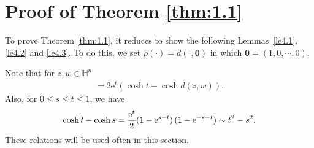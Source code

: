 \documentclass[11pt]{amsproc}
\newcommand{\e}{\mathrm{e}}
\newcommand{\0}{\mathbf{0}}
\renewcommand{\H}{\mathbb{H}}
\numberwithin{equation}{section}
\numberwithin{figure}{section}
\theoremstyle{definition}
\theoremstyle{remark}
\numberwithin{thm}{section}
\begin{document}
\medskip



\section{Proof of Theorem \ref{thm:1.1}}\label{sec:4}
\setcounter{equation}{0}


To prove Theorem \ref{thm:1.1}, it reduces to show  the following Lemmas~\ref{le4.1}, \ref{le4.2} and \ref{le4.3}. To do this,  we set $\rho(\cdot)=d(\cdot,\0)$ in which $\0=(1, 0, \cdots, 0)$.

Note that for $z,w\in\H^n$
\begin{eqnarray*}
[\e^tz-w]=2\e^t(\cosh t-\cosh d(z,w)).
\end{eqnarray*}
Also, for $0\leq s\leq t\leq 1$, we have
\begin{eqnarray*}
\cosh t-\cosh s={\e^t\over 2}(1-\e^{s-t})\,(1-\e^{-s-t})\sim t^2-s^2.
\end{eqnarray*}
These relations will be used often in this section.
\end{document}
